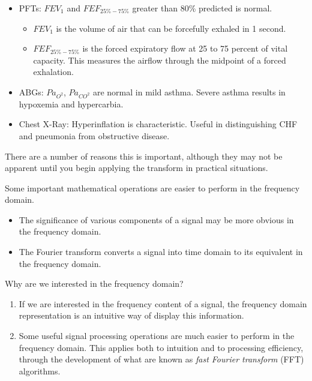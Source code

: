 \documentclass[11pt,letterpaper,draft]{exam}
\renewcommand{\SolutionEmphasis}{\itshape \small}
\begin{document}
\begin{questions}
\begin{TheSolution}
\SolutionEmphasis 
\begin{itemize}
\item PFTs: $FEV_{1}$ and $FEF_{25\%-75\%}$ greater than 80\% predicted is normal.
\begin{itemize}
\item $FEV_{1}$ is the volume of air that can be forcefully exhaled in 1 second.

\item $FEF_{25\%-75\%}$ is the forced expiratory flow at 25 to 75 percent of vital
capacity. This measures the airflow through the midpoint of a forced exhalation.
\end{itemize}

\item ABGs: $Pa_{O^2}$, $Pa_{CO^2}$ are normal in mild asthma. Severe asthma results in
hypoxemia and hypercarbia.

\item Chest X-Ray: Hyperinflation is characteristic. Useful in distinguishing CHF
and pneumonia from obstructive disease.

\end{itemize}

\end{TheSolution}
\end{questions}

There are a number of reasons this is important, although they may not
be apparent until you begin applying the transform in practical
situations.

Some important mathematical operations are easier to perform in the
frequency domain.

\begin{itemize}
\item The significance of various components of a signal may be more obvious
in the frequency domain.
\item The Fourier transform converts a signal into time domain to its
equivalent in the frequency domain.
\end{itemize}

Why are we interested in the frequency domain?

\begin{enumerate}
\item If we are interested in the frequency content of a signal, the
frequency domain representation is an intuitive way of display this
information.
\item Some useful signal processing operations are much easier to perform
in the frequency domain. This applies both to intuition and to
processing efficiency, through the development of what are known as
\textit{fast Fourier transform} (FFT)
algorithms.
\end{enumerate}
\end{document}
